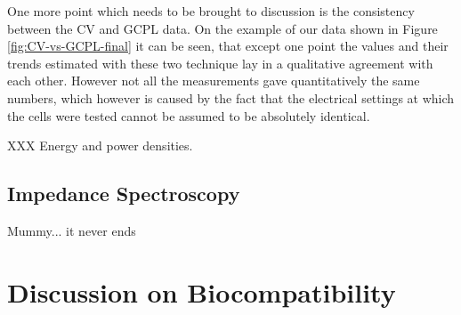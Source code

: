 One more point which needs to be brought to discussion is the consistency between the CV and GCPL data. On the example of our data shown in Figure \ref{fig:CV-vs-GCPL-final} it can be seen, that except one point the values and their trends estimated with these two technique lay in a qualitative agreement with each other. However not all the measurements gave quantitatively the same numbers, which however is caused by the fact that the electrical settings at which the cells were tested cannot be assumed to be absolutely identical.



XXX Energy and power densities.





 
 
 



\subsection{Impedance Spectroscopy}

Mummy... it never ends

\section{Discussion on Biocompatibility}